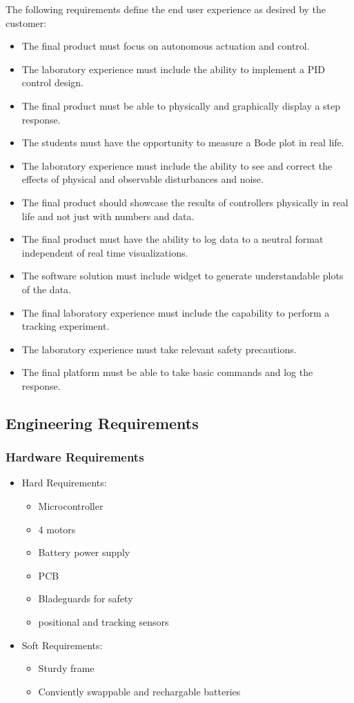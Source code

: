 \documentclass[12pt, titlepage]{article}
\begin{document}
The following requirements define the end user experience as desired by the customer:
  \begin{itemize}
    \item The final product must focus on autonomous actuation and control.
    \item The laboratory experience must include the ability to implement a PID control design.
    \item The final product must be able to physically and graphically display a step response.
    \item The students must have the opportunity to measure a Bode plot in real life.
    \item The laboratory experience must include the ability to see and correct the effects of physical and observable disturbances and noise.
    \item The final product should showcase the results of controllers physically in real life and not just with numbers and data.
    \item The final product must have the ability to log data to a neutral format independent of real time visualizations.
    \item The software solution must include widget to generate understandable plots of the data.
    \item The final laboratory experience must include the capability to perform a tracking experiment.
    \item The laboratory experience must take relevant safety precautions.
    \item The final platform must be able to take basic commands and log the response. 
  \end{itemize}
\subsection{Engineering Requirements}
\subsubsection{Hardware Requirements}
\begin{itemize}
  \item[$\Rightarrow$] Hard Requirements:
  \begin{itemize}
    \item Microcontroller
    \item 4 motors
    \item Battery power supply
    \item PCB
    \item Bladeguards for safety
    \item positional and tracking sensors
  \end{itemize}
  \item[$\Rightarrow$] Soft Requirements:
  \begin{itemize}
    \item Sturdy frame
    \item Conviently swappable and rechargable batteries
  \end{itemize}
\end{itemize}
\end{document}
